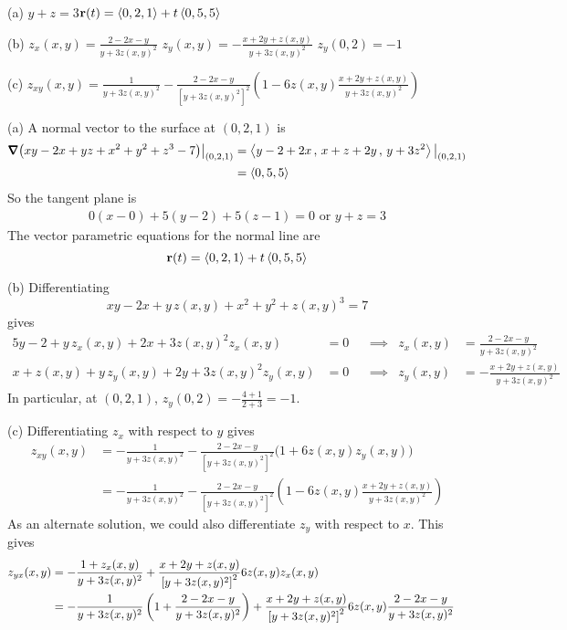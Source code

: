 %

\begin{answer}
(a) $y+z=3$\qquad $\mathbf{r}(t)=\left< 0,2,1\right>+t\left< 0,5,5\right>$

(b) $z_x(x,y)=\frac{2-2x-y}{y+3z(x,y)^2}$\qquad
    $z_y(x,y)=-\frac{x+2y+z(x,y)}{y+3z(x,y)^2}$\qquad
    $z_y(0,2)=-1$

(c) $z_{xy}(x,y)=\frac{1}{y+3z(x,y)^2}
-\frac{2-2x-y}{{[y+3z(x,y)^2]}^2}
\left(1-6z(x,y)\frac{x+2y+z(x,y)}{y+3z(x,y)^2}\right)$
\end{answer}

\begin{solution}
(a) 
 A normal vector to the surface at $(0,2,1)$ is
\begin{align*}
\vnabla\big(xy-2x+yz+x^2+y^2+z^3-7\big)\big|_{(0,2,1)}
&=\llt y-2+2x\,,\,x+z+2y\,,\,y+3z^2\rgt\big|_{(0,2,1)}\\
&=\llt 0, 5, 5\rgt
\end{align*}
So the tangent plane is 
\begin{align*}
0(x-0)+5(y-2)+5(z-1)=0\text{ or }y+z=3
\end{align*}
The vector parametric equations for the normal line are
\begin{equation*}
\mathbf{r}(t)=\left< 0,2,1\right>+t\left< 0,5,5\right>
\end{equation*}

(b) Differentiating
\begin{equation*}
xy-2x+y\,z(x,y)+x^2+y^2+z(x,y)^3=7
\end{equation*}
gives
\begin{alignat*}{5}
y-2+y\,z_x(x,y)+2x+3z(x,y)^2z_x(x,y)&=0 &   &\implies &
z_x(x,y)&=\frac{2-2x-y}{y+3z(x,y)^2}\\
x+z(x,y)+y\,z_y(x,y)+2y+3z(x,y)^2z_y(x,y)&=0 &   &\implies &
z_y(x,y)&=-\frac{x+2y+z(x,y)}{y+3z(x,y)^2}
\end{alignat*}
In particular, at $(0,2,1)$, $z_y(0,2)=-\frac{4+1}{2+3}=-1$. 

(c)
Differentiating $z_x$ with respect to $y$ gives
\begin{align*}
z_{xy}(x,y)
&=-\frac{1}{y+3z(x,y)^2}
-\frac{2-2x-y}{{[y+3z(x,y)^2]}^2}\big(1+6z(x,y)z_y(x,y)\big)\\
&=-\frac{1}{y+3z(x,y)^2}
-\frac{2-2x-y}{{[y+3z(x,y)^2]}^2}
\left(1-6z(x,y)\frac{x+2y+z(x,y)}{y+3z(x,y)^2}\right)
\end{align*}
As an alternate solution, we could also  differentiate $z_y$ with respect 
to $x$. This gives
\begin{align*}
z_{yx}(x,y)
&=-\frac{1+z_x(x,y)}{y+3z(x,y)^2}
+\frac{x+2y+z(x,y)}{{[y+3z(x,y)^2]}^2}6z(x,y)z_x(x,y)\cr
&=-\frac{1}{y+3z(x,y)^2}\left(1+\frac{2-2x-y}{y+3z(x,y)^2}\right)
+\frac{x+2y+z(x,y)}{{[y+3z(x,y)^2]}^2}6z(x,y)\frac{2-2x-y}{y+3z(x,y)^2}
\end{align*}
\end{solution}


